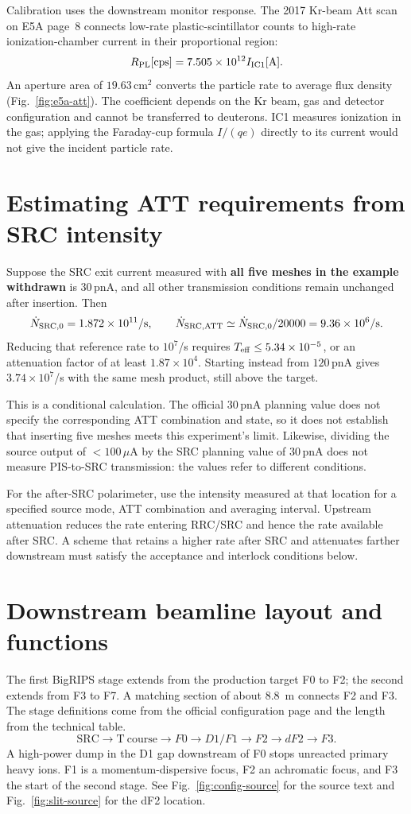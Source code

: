 \documentclass[11pt,a4paper]{article}
\begin{document}
Calibration uses the downstream monitor response. The 2017 Kr-beam Att scan on E5A page~8 connects low-rate plastic-scintillator counts to high-rate ionization-chamber current in their proportional region:
\[
R_{\rm PL}[\mathrm{cps}]=7.505\times10^{12}I_{\rm IC1}[\mathrm A].
\]
An aperture area of $19.63\,\mathrm{cm^2}$ converts the particle rate to average flux density (Fig.~\ref{fig:e5a-att}).\cite{e5a} The coefficient depends on the Kr beam, gas and detector configuration and cannot be transferred to deuterons. IC1 measures ionization in the gas; applying the Faraday-cup formula $I/(qe)$ directly to its current would not give the incident particle rate.

\section{Estimating ATT requirements from SRC intensity}
\label{sec:att-budget}
Suppose the SRC exit current measured with \textbf{all five meshes in the example withdrawn} is $30\,\mathrm{pnA}$, and all other transmission conditions remain unchanged after insertion. Then
\[
\dot N_{\rm SRC,0}=1.872\times10^{11}/\mathrm s,
\qquad
\dot N_{\rm SRC,ATT}\simeq\dot N_{\rm SRC,0}/20000
=9.36\times10^6/\mathrm s.
\]
Reducing that reference rate to $10^7$/s requires $T_{\rm eff}\leq5.34\times10^{-5}$, or an attenuation factor of at least $1.87\times10^4$. Starting instead from $120\,\mathrm{pnA}$ gives $3.74\times10^7$/s with the same mesh product, still above the target.

This is a conditional calculation. The official $30\,\mathrm{pnA}$ planning value does not specify the corresponding ATT combination and state, so it does not establish that inserting five meshes meets this experiment's limit. Likewise, dividing the source output of $<100\,\mu\mathrm A$ by the SRC planning value of $30\,\mathrm{pnA}$ does not measure PIS-to-SRC transmission: the values refer to different conditions.

For the after-SRC polarimeter, use the intensity measured at that location for a specified source mode, ATT combination and averaging interval. Upstream attenuation reduces the rate entering RRC/SRC and hence the rate available after SRC. A scheme that retains a higher rate after SRC and attenuates farther downstream must satisfy the acceptance and interlock conditions below.

\section{Downstream beamline layout and functions}
The first BigRIPS stage extends from the production target F0 to F2; the second extends from F3 to F7. A matching section of about 8.8~m connects F2 and F3. The stage definitions come from the official configuration page and the length from the technical table.\cite{bigrips-config,bigrips-technical}
\[
\mathrm{SRC}\to\mathrm{T\ course}\to F0\to D1/F1\to F2\to dF2\to F3.
\]
A high-power dump in the D1 gap downstream of F0 stops unreacted primary heavy ions. F1 is a momentum-dispersive focus, F2 an achromatic focus, and F3 the start of the second stage.\cite{bigrips-config} See Fig.~\ref{fig:config-source} for the source text and Fig.~\ref{fig:slit-source} for the dF2 location.
\end{document}
